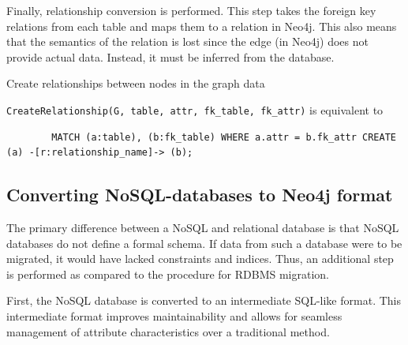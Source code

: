 \documentclass[12pt]{article}
\begin{document}
    Finally, relationship conversion is performed. This step takes the foreign key relations from each table and maps them to a relation in Neo4j. This also means that the semantics of the relation is lost since the edge (in Neo4j) does not provide actual data. Instead, it must be inferred from the database.

    \begin{algorithm}[htb!]
        \SetAlgoLined
        \caption{Create relationships between nodes in the graph data}
        \label{algo:sql2rel}
    \end{algorithm}

    \verb|CreateRelationship(G, table, attr, fk_table, fk_attr)| is equivalent to 
    \begin{lstlisting}
        MATCH (a:table), (b:fk_table) WHERE a.attr = b.fk_attr CREATE (a) -[r:relationship_name]-> (b);
    \end{lstlisting}

    \subsection{Converting NoSQL-databases to Neo4j format}
    The primary difference between a NoSQL and relational database is that NoSQL databases do not define a formal schema. If data from such a database were to be migrated, it would have lacked constraints and indices. Thus, an additional step is performed as compared to the procedure for RDBMS migration.

    First, the NoSQL database is converted to an intermediate SQL-like format. This intermediate format improves maintainability and allows for seamless management of attribute characteristics over a traditional method.
\end{document}
